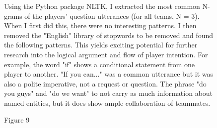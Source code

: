 \begin{figure}[h!]
    \centering
    \caption{Using the Python package NLTK, I extracted the most common N-grams of the players' question utterances (for all teams, N = 3). When I first did this, there were no interesting patterns. I then removed the "English" library of stopwords to be removed and found the following patterns. This yields exciting potential for further research into the logical argument and flow of player intention. For example, the word "if" shows a conditional statement from one player to another. "If you can..." was a common utterance but it was also a polite imperative, not a request or question. The phrase "do you guys" and "do we want" to not carry as much information about named entities, but it does show ample collaboration of teammates. }
\end{figure}








\newpage



\begin{figure}[h!]
    \centering
    \caption{Figure 9}
\end{figure}





